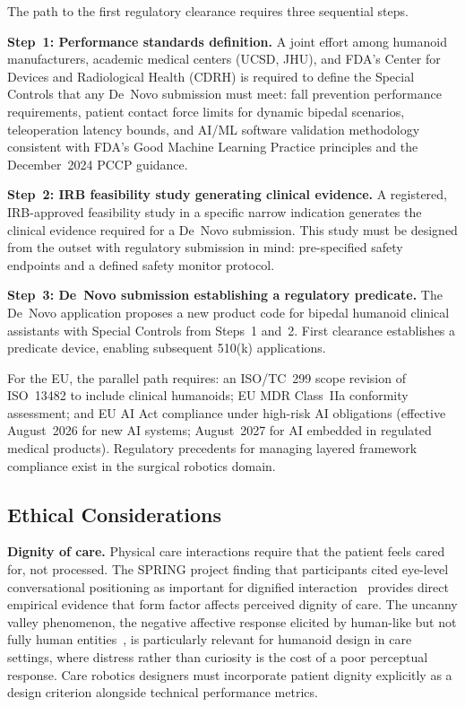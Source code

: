 The path to the first regulatory clearance requires three sequential steps.

\textbf{Step~1: Performance standards definition.} A joint effort among humanoid
manufacturers, academic medical centers (UCSD, JHU), and FDA's Center for Devices
and Radiological Health (CDRH) is required to define the Special Controls that
any De~Novo submission must meet: fall prevention performance requirements, patient
contact force limits for dynamic bipedal scenarios, teleoperation latency bounds,
and AI/ML software validation methodology consistent with FDA's Good Machine
Learning Practice principles and the December~2024 PCCP guidance.

\textbf{Step~2: IRB feasibility study generating clinical evidence.} A registered,
IRB-approved feasibility study in a specific narrow indication generates the
clinical evidence required for a De~Novo submission. This study must be designed
from the outset with regulatory submission in mind: pre-specified safety endpoints
and a defined safety monitor protocol.

\textbf{Step~3: De~Novo submission establishing a regulatory predicate.} The
De~Novo application proposes a new product code for bipedal humanoid clinical
assistants with Special Controls from Steps~1 and~2. First clearance establishes
a predicate device, enabling subsequent 510(k) applications.

For the EU, the parallel path requires: an ISO/TC~299 scope revision of
ISO~13482 to include clinical humanoids; EU MDR Class~IIa conformity assessment;
and EU AI Act compliance under high-risk AI obligations (effective August~2026 for
new AI systems; August~2027 for AI embedded in regulated medical products).
Regulatory precedents for managing layered framework compliance exist in the
surgical robotics domain.

\subsection{Ethical Considerations}
\label{sec:ethics}

\textbf{Dignity of care.} Physical care interactions require that the patient
feels cared for, not processed. The SPRING project finding that participants cited
eye-level conversational positioning as important for dignified
interaction~\cite{alamedapineda2024spring} provides direct empirical evidence that
form factor affects perceived dignity of care. The uncanny valley phenomenon, the
negative affective response elicited by human-like but not fully human
entities~\cite{mori2012uncanny}, is particularly relevant for humanoid design in
care settings, where distress rather than curiosity is the cost of a poor
perceptual response. Care robotics designers must incorporate patient dignity
explicitly as a design criterion alongside technical performance metrics.

